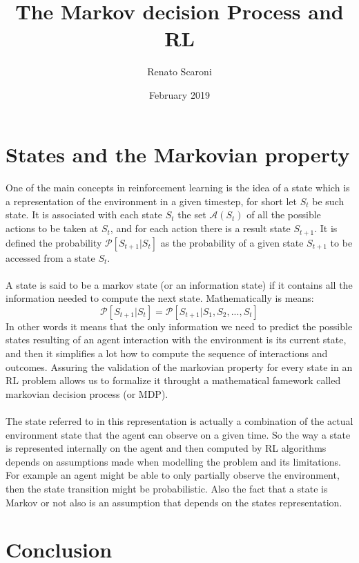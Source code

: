 \documentclass{article}
\title{The Markov decision Process and RL}
\author{Renato Scaroni}
\date{February 2019}
\begin{document}
\maketitle

\section{States and the Markovian property}
\paragraph{}
One of the main concepts in reinforcement learning is the idea of a state which is a representation of the environment in a given timestep, for short let $S_t$ be such state. It is associated with each state $S_t$ the set $\mathcal{A}(S_t)$ of all the possible actions to be taken at $S_t$, and for each action there is a result state $S_{t+1}$. It is defined the probability $\mathcal{P}[S_{t+1}|S_t]$ as the probability of a given state $S_{t+1}$ to be accessed from a state $S_t$.
\paragraph{}
A state is said to be a markov state (or an information state) if it contains all the information needed to compute the next state. Mathematically is means:
\[\mathcal{P}[S_{t+1}|S_t] = \mathcal{P}[S_{t+1}|S_{1}, S_{2}, ..., S_{t}]\]
In other words it means that the only information we need to predict the possible states resulting of an agent interaction with the environment is its current state, and then it simplifies a lot how to compute the sequence of interactions and outcomes. Assuring the validation of the markovian property for every state in an RL problem allows us to formalize it throught a mathematical famework called markovian decision process (or MDP).
\paragraph{}
The state referred to in this representation is actually a combination of the actual environment state that the agent can observe on a given time. So the way a state is represented internally on the agent and then computed by RL algorithms depends on assumptions made when modelling the problem and its limitations. For example an agent might be able to only partially observe the environment, then the state transition might be probabilistic. Also the fact that a state is Markov or not also is an assumption that depends on the states representation. 

\section{Conclusion}
\paragraph{}
\end{document}
